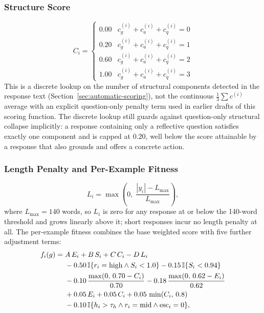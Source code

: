 \documentclass[mathematics,article,xetex,moreauthors]{Definitions/mdpi}
\begin{document}
\subsubsection{Structure Score}
\begin{equation}
\label{eq:structure}
  C_i =
  \begin{cases}
    0.00 & c_g^{(i)}+c_a^{(i)}+c_q^{(i)} = 0 \\
    0.20 & c_g^{(i)}+c_a^{(i)}+c_q^{(i)} = 1 \\
    0.60 & c_g^{(i)}+c_a^{(i)}+c_q^{(i)} = 2 \\
    1.00 & c_g^{(i)}+c_a^{(i)}+c_q^{(i)} = 3
  \end{cases}
\end{equation}
This is a discrete lookup on the number of structural components detected in
the response text (Section~\ref{sec:automatic-scoring}), not the continuous
\(\tfrac{1}{3}\sum c^{(i)}\) average with an explicit question-only penalty
term used in earlier drafts of this scoring function. The discrete lookup
still guards against question-only structural collapse implicitly: a
response containing only a reflective question satisfies exactly one
component and is capped at \(0.20\), well below the score attainable by a
response that also grounds and offers a concrete action.

\subsubsection{Length Penalty and Per-Example Fitness}
\begin{equation}
\label{eq:per-example}
  L_i = \max\!\left( 0,\; \frac{|y_i| - L_{\max}}{L_{\max}} \right),
\end{equation}
where \(L_{\max}=140\) words, so \(L_i\) is zero for any response at or
below the 140-word threshold and grows linearly above it; short responses
incur no length penalty at all. The per-example fitness combines the base
weighted score with five further adjustment terms:
\begin{align}
  \label{eq:per-example-fitness}
    f_i(g) = {}& A\,E_i + B\,S_i + C\,C_i - D\,L_i \notag\\
      & - 0.50\,\mathbb{I}\{r_i=\mathrm{high} \wedge S_i<1.0\}
        - 0.15\,\mathbb{I}\{S_i<0.94\} \notag\\
      & - 0.10\,\frac{\max(0,\,0.70-C_i)}{0.70}
        - 0.18\,\frac{\max(0,\,0.62-E_i)}{0.62} \notag\\
      & + 0.05\,E_i + 0.05\,C_i + 0.05\,\min(C_i,\,0.8) \notag\\
      & - 0.10\,\mathbb{I}\{h_i > \tau_h \wedge r_i=\mathrm{mid} \wedge \mathrm{esc}_i=0\},
\end{align}
\end{document}
